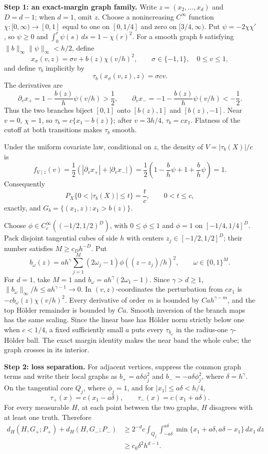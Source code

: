 \textbf{Step 1: an exact-margin graph family.} Write \(z=(x_2,\ldots,x_d)\) and \(D=d-1\); when \(d=1\), omit \(z\). Choose a nonincreasing \(C^\infty\) function \(\chi:[0,\infty)\to[0,1]\) equal to one on \([0,1/4]\) and zero on \([3/4,\infty)\). Put \(\psi=-2\chi\chi'\), so \(\psi\ge0\) and \(\int_0^r\psi(s)\,ds=1-\chi(r)^2\). For a smooth graph \(b\) satisfying \(\|b\|_\infty\|\psi\|_\infty<h/2\), define
\[
x_\sigma(v,z)=\sigma v+b(z)\chi(v/h)^2,
\qquad \sigma\in\{-1,1\},\quad 0\le v\le1,
\]
and define \(\tau_b\) implicitly by
\[
\tau_b(x_\sigma(v,z),z)=\sigma cv.
\]
The derivatives are
\[
\partial_vx_+=1-\frac{b(z)}h\psi(v/h)>\frac12,
\qquad
\partial_vx_-=-1-\frac{b(z)}h\psi(v/h)<-\frac12.
\]
Thus the two branches biject \([0,1]\) onto \([b(z),1]\) and \([b(z),-1]\). Near \(v=0\), \(\chi=1\), so \(\tau_b=c\{x_1-b(z)\}\); after \(v=3h/4\), \(\tau_b=cx_1\). Flatness of the cutoff at both transitions makes \(\tau_b\) smooth.

Under the uniform covariate law, conditional on \(z\), the density of \(V=|\tau_b(X)|/c\) is
\[
f_{V\mid z}(v)=\frac12\left(|\partial_vx_+|+|\partial_vx_-|\right)
=\frac12\left(1-\frac b h\psi+1+\frac b h\psi\right)=1.
\]
Consequently
\[
P_X\{0<|\tau_b(X)|\le t\}=\frac tc,\qquad 0<t\le c,
\]
exactly, and \(G_b=\{(x_1,z):x_1>b(z)\}\).

Choose \(\phi\in C_c^\infty((-1/2,1/2)^D)\), with \(0\le\phi\le1\) and \(\phi=1\) on \([-1/4,1/4]^D\). Pack disjoint tangential cubes of side \(h\) with centers \(z_j\in[-1/2,1/2]^D\); their number satisfies \(M\ge c_Dh^{-D}\). Put
\[
b_\omega(z)=a h^\gamma\sum_{j=1}^M(2\omega_j-1)\phi((z-z_j)/h)^2,
\qquad \omega\in\{0,1\}^M.
\]
For \(d=1\), take \(M=1\) and \(b_\omega=a h^\gamma(2\omega_1-1)\). Since \(\gamma>d\ge1\), \(\|b_\omega\|_\infty/h\le ah^{\gamma-1}\to0\). In \((v,z)\)-coordinates the perturbation from \(cx_1\) is \(-cb_\omega(z)\chi(v/h)^2\). Every derivative of order \(m\) is bounded by \(Ca h^{\gamma-m}\), and the top Hölder remainder is bounded by \(Ca\). Smooth inversion of the branch maps has the same scaling. Since the linear base has Hölder norm strictly below one when \(c<1/4\), a fixed sufficiently small \(a\) puts every \(\tau_{b_\omega}\) in the radius-one \(\gamma\)-Hölder ball. The exact margin identity makes the near band the whole cube; the graph crosses in its interior.

\textbf{Step 2: loss separation.} For adjacent vertices, suppress the common graph terms and write their local graphs as \(b_+=a\delta\phi_j^2\) and \(b_-=-a\delta\phi_j^2\), where \(\delta=h^\gamma\). On the tangential core \(Q_j\), where \(\phi_j=1\), and for \(|x_1|\le a\delta<h/4\),
\[
\tau_+(x)=c(x_1-a\delta),\qquad \tau_-(x)=c(x_1+a\delta).
\]
For every measurable \(H\), at each point between the two graphs, \(H\) disagrees with at least one truth. Therefore
\[
\begin{aligned}
d_H(H,G_+;P_+)+d_H(H,G_-;P_-)
&\ge 2^{-d}c\int_{Q_j}\int_{-a\delta}^{a\delta}
\min\{x_1+a\delta,a\delta-x_1\}\,dx_1\,dz\\
&\ge c_0\delta^2h^{d-1}.
\end{aligned}
\]

